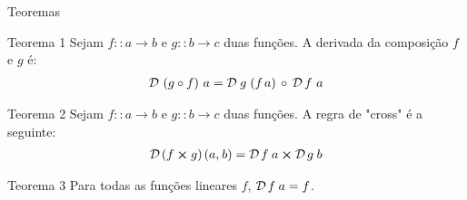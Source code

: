 \documentclass{beamer}
\theoremstyle{definition}
\theoremstyle{definition}
\theoremstyle{theorem}
\begin{document}
\begin{frame}{Teoremas}

\begin{block}{Teorema 1}
  Sejam $f:: a \to b$ e $g:: b \to c$ duas funções. A derivada da composição $f$ e $g$ é:
	\begin{align*}
	\mathcal{D} \ (g \circ f ) \ a= \mathcal{D} \hspace{0.9mm} g \hspace{1.0mm}  (f \hspace{0.5mm} a)   \hspace{0.6mm} \circ \hspace{0.6mm} \mathcal{D} \hspace{0.6mm} f \ a
	\end{align*}
\end{block}


\begin{block}{Teorema 2}
  Sejam $f:: a \to b$ e $g:: b \to c$ duas funções. A regra de "cross" é a seguinte:
	\begin{align*}
	\mathcal{D} \hspace{0.5mm} (f \boldsymbol{\times} g) \hspace{0.5mm} (a,\hspace{0.2mm} b) = \mathcal{D} \hspace{0.5mm} f \hspace{0.9mm} a \boldsymbol{\times} \mathcal{D} \hspace{0.5mm} g \hspace{0.9mm} b
	\end{align*}
\end{block}


\begin{block}{Teorema 3}
  Para todas as funções lineares $f$, $\mathcal{D} \hspace{0.5mm} f \hspace{0.9mm} a = f $.
\end{block}

\end{frame}
\end{document}
